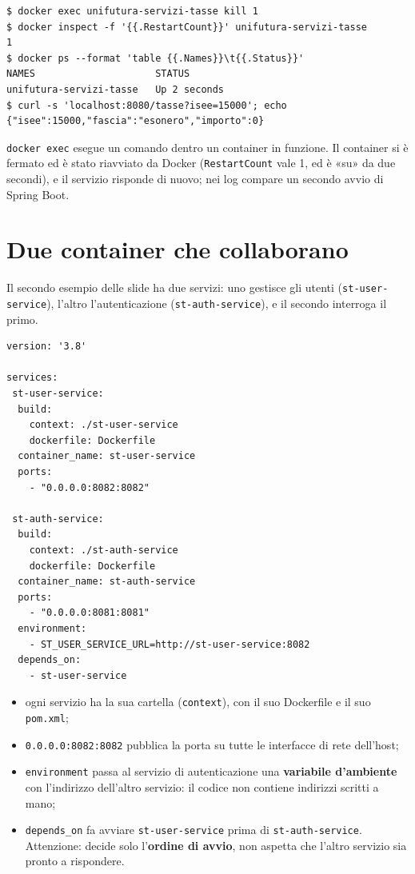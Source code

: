 \begin{lstlisting}[style=shell, name=Terminale]
$ docker exec unifutura-servizi-tasse kill 1
$ docker inspect -f '{{.RestartCount}}' unifutura-servizi-tasse
1
$ docker ps --format 'table {{.Names}}\t{{.Status}}'
NAMES                     STATUS
unifutura-servizi-tasse   Up 2 seconds
$ curl -s 'localhost:8080/tasse?isee=15000'; echo
{"isee":15000,"fascia":"esonero","importo":0}
\end{lstlisting}

\texttt{docker exec} esegue un comando dentro un container in funzione. Il container si è fermato ed è stato
riavviato da Docker (\texttt{RestartCount} vale 1, ed è «su» da due secondi), e il servizio risponde di nuovo; nei log
compare un secondo avvio di Spring Boot.

\section{Due container che collaborano}

Il secondo esempio delle slide ha due servizi: uno gestisce gli utenti (\texttt{st-user-service}), l'altro
l'autenticazione (\texttt{st-auth-service}), e il secondo interroga il primo.

\begin{lstlisting}[style=yaml, name=st-microservices/docker-compose.yml]
version: '3.8'

services:
 st-user-service:
  build:
    context: ./st-user-service
    dockerfile: Dockerfile
  container_name: st-user-service
  ports:
    - "0.0.0.0:8082:8082"

 st-auth-service:
  build:
    context: ./st-auth-service
    dockerfile: Dockerfile
  container_name: st-auth-service
  ports:
    - "0.0.0.0:8081:8081"
  environment:
    - ST_USER_SERVICE_URL=http://st-user-service:8082
  depends_on:
    - st-user-service
\end{lstlisting}

\begin{itemize}
  \item ogni servizio ha la sua cartella (\texttt{context}), con il suo Dockerfile e il suo \texttt{pom.xml};
  \item \texttt{0.0.0.0:8082:8082} pubblica la porta su tutte le interfacce di rete dell'host;
  \item \texttt{environment} passa al servizio di autenticazione una \textbf{variabile d'ambiente} con l'indirizzo
        dell'altro servizio: il codice non contiene indirizzi scritti a mano;
  \item \texttt{depends\_on} fa avviare \texttt{st-user-service} prima di \texttt{st-auth-service}. Attenzione: decide
        solo l'\textbf{ordine di avvio}, non aspetta che l'altro servizio sia pronto a rispondere.
\end{itemize}

